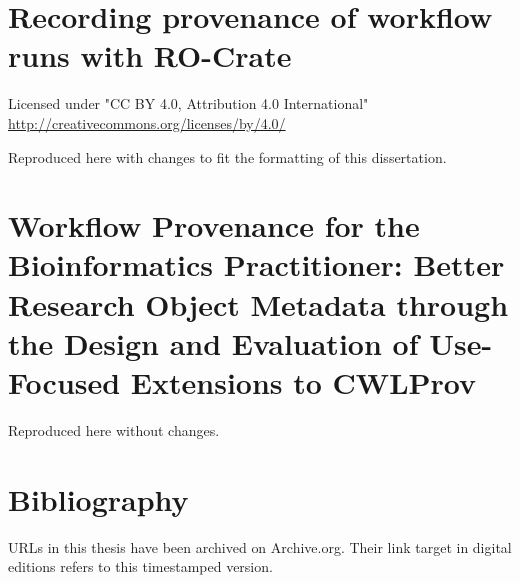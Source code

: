 \documentclass{dissertation}
\begin{document}
\chapter{Recording provenance of workflow runs with RO-Crate}
\label{wrroc}

Licensed under "CC BY 4.0, Attribution 4.0 International" \url{http://creativecommons.org/licenses/by/4.0/}

Reproduced here with changes to fit the formatting of this dissertation.


\chapter{Workflow Provenance for the Bioinformatics Practitioner: Better Research Object Metadata through the Design and Evaluation of Use-Focused Extensions to CWLProv}
\label{cwlprov-analysis}
Reproduced here without changes.


%


%

\thumbfalse

\chapter*{Bibliography}

URLs in this thesis have been archived on Archive.org. Their link target in digital editions refers
to this timestamped version.

\printbibliography


\glsaddall
\printglossary[type=\acronymtype,title={Glossary}]

%
%
%
\end{document}
